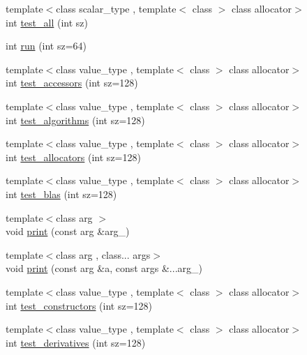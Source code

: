 \begin{DoxyCompactItemize}
\item 
{\footnotesize template$<$class scalar\+\_\+type , template$<$ class $>$ class allocator$>$ }\\int \hyperlink{namespaceBC_1_1tests_aaee548b243f2820b7e6841d2144b1033}{test\+\_\+all} (int sz)
\item 
int \hyperlink{namespaceBC_1_1tests_ae9ac24b483eaf16dcf489ed16bf2af91}{run} (int sz=64)
\item 
{\footnotesize template$<$class value\+\_\+type , template$<$ class $>$ class allocator$>$ }\\int \hyperlink{namespaceBC_1_1tests_a8eeded6808a3cbd19a4d317974d59af9}{test\+\_\+accessors} (int sz=128)
\item 
{\footnotesize template$<$class value\+\_\+type , template$<$ class $>$ class allocator$>$ }\\int \hyperlink{namespaceBC_1_1tests_a94290a4622c4b5e8c07e44bc42682f06}{test\+\_\+algorithms} (int sz=128)
\item 
{\footnotesize template$<$class value\+\_\+type , template$<$ class $>$ class allocator$>$ }\\int \hyperlink{namespaceBC_1_1tests_a25af0783bf910a02f2a58f73c77dc8a5}{test\+\_\+allocators} (int sz=128)
\item 
{\footnotesize template$<$class value\+\_\+type , template$<$ class $>$ class allocator$>$ }\\int \hyperlink{namespaceBC_1_1tests_ae53875f04f1792f11eea83fc00363fd7}{test\+\_\+blas} (int sz=128)
\item 
{\footnotesize template$<$class arg $>$ }\\void \hyperlink{namespaceBC_1_1tests_abfb05e02a76f37a27741a760ef2d6667}{print} (const arg \&arg\+\_\+)
\item 
{\footnotesize template$<$class arg , class... args$>$ }\\void \hyperlink{namespaceBC_1_1tests_abf1edddf246f391b1e7eba60df46b6d7}{print} (const arg \&a, const args \&...arg\+\_\+)
\item 
{\footnotesize template$<$class value\+\_\+type , template$<$ class $>$ class allocator$>$ }\\int \hyperlink{namespaceBC_1_1tests_af425827258b890d04a848cb121b18a07}{test\+\_\+constructors} (int sz=128)
\item 
{\footnotesize template$<$class value\+\_\+type , template$<$ class $>$ class allocator$>$ }\\int \hyperlink{namespaceBC_1_1tests_a4b02d4fbd339d1201414d0f84620ec8d}{test\+\_\+derivatives} (int sz=128)

\end{DoxyCompactItemize}
